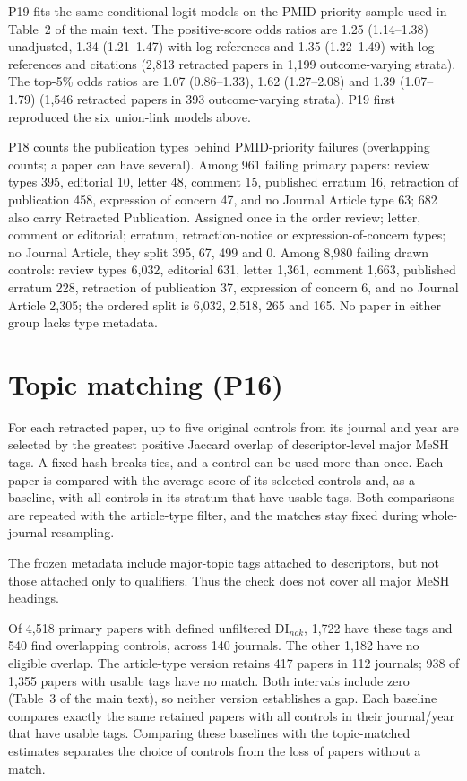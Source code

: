P19 fits the same conditional-logit models on the PMID-priority sample used in Table~2 of the main text.
The positive-score odds ratios are 1.25 (1.14--1.38) unadjusted, 1.34 (1.21--1.47) with log references and
1.35 (1.22--1.49) with log references and citations (2,813 retracted papers in 1,199 outcome-varying strata).
The top-5\% odds ratios are 1.07 (0.86--1.33), 1.62 (1.27--2.08) and 1.39 (1.07--1.79) (1,546 retracted papers in
393 outcome-varying strata). P19 first reproduced the six union-link models above.

P18 counts the publication types behind PMID-priority failures (overlapping counts; a paper can have several).
Among 961 failing primary papers: review types 395, editorial 10, letter 48, comment 15, published erratum 16,
retraction of publication 458, expression of concern 47, and no Journal Article type 63; 682 also carry Retracted
Publication. Assigned once in the order review; letter, comment or editorial; erratum, retraction-notice or
expression-of-concern types; no Journal Article, they split 395, 67, 499 and 0. Among 8,980 failing drawn
controls: review types 6,032, editorial 631, letter 1,361, comment 1,663, published erratum 228, retraction of
publication 37, expression of concern 6, and no Journal Article 2,305; the ordered split is 6,032, 2,518, 265
and 165. No paper in either group lacks type metadata.

\section{Topic matching (P16)}\label{sec:s-topic}
For each retracted paper, up to five original controls from its journal and year are selected by the greatest
positive Jaccard overlap of descriptor-level major MeSH tags. A fixed hash breaks ties, and a control can be used
more than once. Each paper is compared with the average score of its selected controls and, as a baseline, with all
controls in its stratum that have usable tags. Both comparisons are repeated with the article-type filter, and the
matches stay fixed during whole-journal resampling.

The frozen metadata include major-topic tags attached to descriptors, but not those attached only to qualifiers.
Thus the check does not cover all major MeSH headings.

Of 4,518 primary papers with defined unfiltered DI$_{nok}$, 1,722 have these tags and 540 find overlapping
controls, across 140 journals. The other 1,182 have no eligible overlap.
The article-type version retains 417 papers in 112 journals; 938 of 1,355 papers with usable tags have no match.
Both intervals include zero (Table~3 of the main text), so neither version establishes a gap.
Each baseline compares exactly the same retained papers with all controls in their journal/year that have usable
tags. Comparing these baselines with the topic-matched estimates separates the choice of controls from the loss
of papers without a match.
